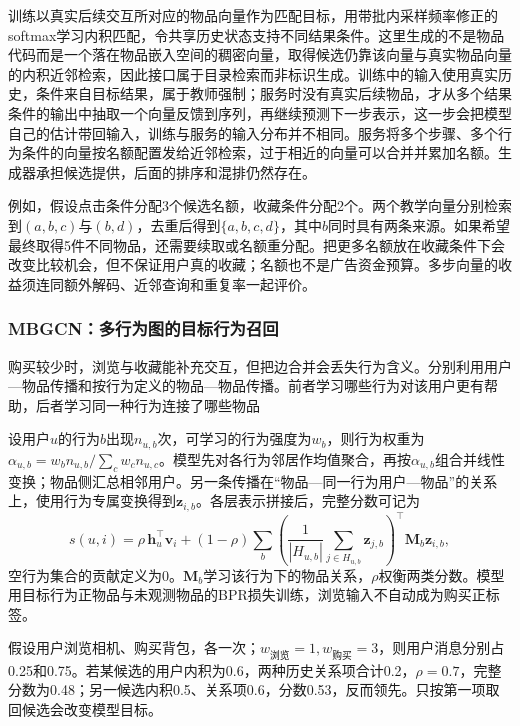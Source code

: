 训练以真实后续交互所对应的物品向量作为匹配目标，用带批内采样频率修正的softmax学习内积匹配，令共享历史状态支持不同结果条件。这里生成的不是物品代码而是一个落在物品嵌入空间的稠密向量，取得候选仍靠该向量与真实物品向量的内积近邻检索，因此接口属于目录检索而非标识生成。训练中的输入使用真实历史，条件来自目标结果，属于教师强制；服务时没有真实后续物品，才从多个结果条件的输出中抽取一个向量反馈到序列，再继续预测下一步表示，这一步会把模型自己的估计带回输入，训练与服务的输入分布并不相同。服务将多个步骤、多个行为条件的向量按名额配置发给近邻检索，过于相近的向量可以合并并累加名额。生成器承担候选提供，后面的排序和混排仍然存在。

例如，假设点击条件分配3个候选名额，收藏条件分配2个。两个教学向量分别检索到$(a,b,c)$与$(b,d)$，去重后得到$\{a,b,c,d\}$，其中$b$同时具有两条来源。如果希望最终取得5件不同物品，还需要续取或名额重分配。把更多名额放在收藏条件下会改变比较机会，但不保证用户真的收藏；名额也不是广告资金预算。多步向量的收益须连同额外解码、近邻查询和重复率一起评价。

\subsubsection{MBGCN：多行为图的目标行为召回}
\label{sec:rs-mbgcn}

购买较少时，浏览与收藏能补充交互，但把边合并会丢失行为含义。分别利用用户—物品传播和按行为定义的物品—物品传播。前者学习哪些行为对该用户更有帮助，后者学习同一种行为连接了哪些物品

设用户$u$的行为$b$出现$n_{u,b}$次，可学习的行为强度为$w_b$，则行为权重为$\alpha_{u,b}=w_bn_{u,b}/\sum_cw_cn_{u,c}$。模型先对各行为邻居作均值聚合，再按$\alpha_{u,b}$组合并线性变换；物品侧汇总相邻用户。另一条传播在“物品—同一行为用户—物品”的关系上，使用行为专属变换得到$\bm z_{i,b}$。各层表示拼接后，完整分数可记为
\begin{equation}
 s(u,i)=\rho\,\bm h_u^\top\bm v_i+
 (1-\rho)\sum_b\left(
 \frac1{|H_{u,b}|}\sum_{j\in H_{u,b}}\bm z_{j,b}\right)^\top
 \bm M_b\bm z_{i,b},
 \label{eq:rs-mbgcn-score}
\end{equation}
空行为集合的贡献定义为0。$\bm M_b$学习该行为下的物品关系，$\rho$权衡两类分数。模型用目标行为正物品与未观测物品的BPR损失训练，浏览输入不自动成为购买正标签。

假设用户浏览相机、购买背包，各一次；$w_{\text{浏览}}=1,w_{\text{购买}}=3$，则用户消息分别占0.25和0.75。若某候选的用户内积为0.6，两种历史关系项合计0.2，$\rho=0.7$，完整分数为0.48；另一候选内积0.5、关系项0.6，分数0.53，反而领先。只按第一项取回候选会改变模型目标。

